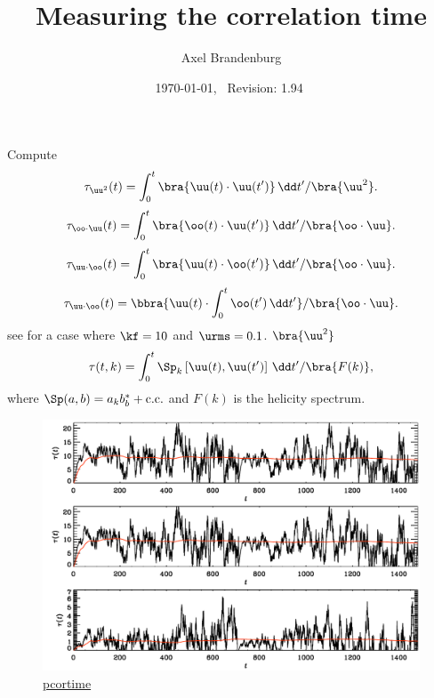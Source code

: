 \documentclass[twocolumn]{article}
\title{Measuring the correlation time}
\author{Axel Brandenburg}
\date{\today,~ $ $Revision: 1.94 $ $}
\begin{document}
\maketitle




Compute
\begin{equation}
\tau_{\uu^2}(t)=\int_0^t \bra{\uu(t)\cdot\uu(t')}\,\dd t'/\bra{\uu^2}.
\end{equation}
\begin{equation}
\tau_{\oo\cdot\uu}(t)=\int_0^t \bra{\oo(t)\cdot\uu(t')}\,\dd t'/\bra{\oo\cdot\uu}.
\end{equation}
\begin{equation}
\tau_{\uu\cdot\oo}(t)=\int_0^t \bra{\uu(t)\cdot\oo(t')}\,\dd t'/\bra{\oo\cdot\uu}.
\end{equation}
\begin{equation}
\tau_{\uu\cdot\oo}(t)=\bbra{\uu(t)\cdot\int_0^t \oo(t')\,\dd t'}/\bra{\oo\cdot\uu}.
\end{equation}
see  for a case where $\kf=10$ and $\urms=0.1$.
$\bra{\uu^2}$
\begin{equation}
\tau(t,k)=\int_0^t \Sp_k\left[\uu(t),\uu(t')\right]\,\dd t'/\bra{F(k)},
\end{equation}
where $\Sp(a,b)=a_k b_b^* + \mbox{c.c.}$ and $F(k)$ is the helicity spectrum.

\begin{figure}[h!]\begin{center}
\includegraphics[width=\columnwidth]{pcortime}
\end{center}\caption[]{
\url{pcortime}
}\label{pcortime}\end{figure}
\end{document}
